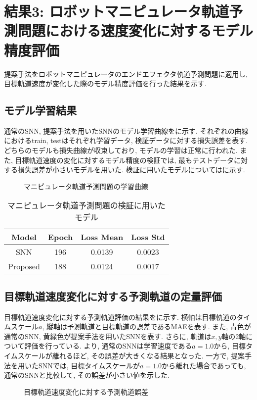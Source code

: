 \section{結果3: ロボットマニピュレータ軌道予測問題における速度変化に対するモデル精度評価} \label{sec:result3}
提案手法をロボットマニピュレータのエンドエフェクタ軌道予測問題に適用し, 目標軌道速度が変化した際のモデル精度評価を行った結果を示す.

\subsection{モデル学習結果}
通常のSNN, 提案手法を用いたSNNのモデル学習曲線をに示す.
それぞれの曲線におけるtrain, testはそれぞれ学習データ, 検証データに対する損失誤差を表す.
どちらのモデルも損失曲線が収束しており, モデルの学習は正常に行われた.
また, 目標軌道速度の変化に対するモデル精度の検証では, 最もテストデータに対する損失誤差が小さいモデルを用いた.
検証に用いたモデルについてはに示す.
\begin{figure}[htb]
    \centering
    
    \caption{マニピュレータ軌道予測問題の学習曲線}
    \label{fig:result3:losscurve}
\end{figure}

\begin{table}[htb]
    \centering
    \caption{マニピュレータ軌道予測問題の検証に用いたモデル}
    \label{tab:result3:model:parameter}
    \begin{tabular}{cccc}
        \hline
        \textbf{Model}& \textbf{Epoch} & \textbf{Loss Mean} & \textbf{Loss Std}\\
        \hline
        SNN &  196 & 0.0139 & 0.0023\\ %
        Proposed & 188 & 0.0124 & 0.0017\\
        \hline
    \end{tabular}
\end{table}
\clearpage


\subsection{目標軌道速度変化に対する予測軌道の定量評価}
目標軌道速度変化に対する予測軌道評価の結果をに示す.
横軸は目標軌道のタイムスケール$a$, 縦軸は予測軌道と目標軌道の誤差であるMAEを表す.
また, 青色が通常のSNN, 黄緑色が提案手法を用いたSNNを表す.
さらに, 軌道は$x, y$軸の2軸について評価を行っている.
より, 通常のSNNは学習速度である$a=1.0$から, 目標タイムスケールが離れるほど, その誤差が大きくなる結果となった.
一方で, 提案手法を用いたSNNでは, 目標タイムスケールが$a=1.0$から離れた場合であっても, 通常のSNNと比較して, その誤差が小さい値を示した.
\begin{figure}[htb]
    \centering
    
    \caption{目標軌道速度変化に対する予測軌道誤差}
    \label{fig:result3:trjerror}
\end{figure}


